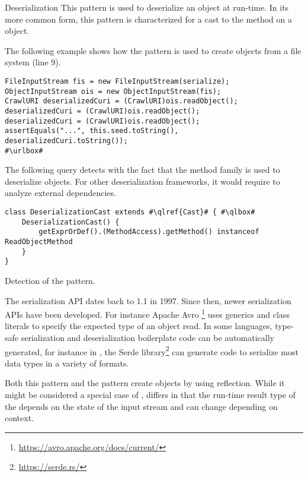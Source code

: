 \begin{pattern}{Deserialization}
This pattern is used to deserialize an object at run-time.
In its more common form,
this pattern is characterized for a cast to the  method on a  object.

\instances{}
The following example shows how the \thisp{} pattern is used to create objects from a file system (line 9).

\def\urlvar{http://bit.ly/internetarchive_heritrix3_2SF4j7k}
\begin{verbatim}
FileInputStream fis = new FileInputStream(serialize);
ObjectInputStream ois = new ObjectInputStream(fis);
CrawlURI deserializedCuri = (CrawlURI)ois.readObject();
deserializedCuri = (CrawlURI)ois.readObject();
deserializedCuri = (CrawlURI)ois.readObject();
assertEquals("...", this.seed.toString(), deserializedCuri.toString());
#\urlbox#
\end{verbatim}


\detection{}
The following query detects \thisp{} with the fact that the  method family is used to deserialize objects.
For other deserialization frameworks,
it would require to analyze external dependencies.

\begin{listing}
\begin{verbatim}
class DeserializationCast extends #\qlref{Cast}# { #\qlbox#
	DeserializationCast() {
		getExprOrDef().(MethodAccess).getMethod() instanceof ReadObjectMethod
	}
}
\end{verbatim}
\caption{Detection of the \thisp{} pattern.}
\label{lst:ql:DeserializationCast}
\end{listing}


\issues{}
The serialization API dates back to \java{} 1.1 in 1997.
Since then, newer serialization APIs have been developed.
For instance Apache Avro%
\footnote{\url{https://avro.apache.org/docs/current/}}
uses generics and class literals to specify the expected type of an object read. 
In some languages,
type-safe serialization and deserialization boilerplate code can be automatically generated,
for instance in \rust{},
the Serde library\footnote{\url{https://serde.rs/}}
can generate code to serialize most data types
in a variety of formats.

Both this pattern and the  pattern create objects by using reflection.
While it might be considered a special case of , 
\thisp{} differs in that the run-time result type of the  depends on the state of the input stream and can change depending on context.
 
\end{pattern}